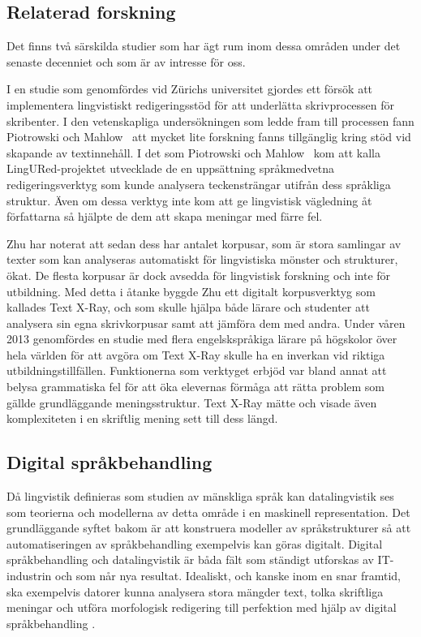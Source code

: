 \documentclass[swedish]{maucsthesis}
\begin{document}
\subsection{Relaterad forskning}\label{relateradforskning}

Det finns två särskilda studier som har ägt rum inom dessa områden under det
senaste decenniet och som är av intresse för oss.

I en studie som genomfördes vid Zürichs universitet gjordes ett försök att
implementera lingvistiskt redigeringsstöd för att underlätta skrivprocessen för
skribenter. I den vetenskapliga undersökningen som ledde fram till processen
fann Piotrowski och Mahlow~\cite{Piotrowski:2009} att mycket lite forskning fanns tillgänglig kring stöd vid skapande av textinnehåll. I det som Piotrowski och Mahlow~\cite{Piotrowski:2009} kom att
kalla LingURed-projektet utvecklade de en uppsättning språkmedvetna
redigeringsverktyg som kunde analysera teckensträngar utifrån dess språkliga
struktur. Även om dessa verktyg inte kom att ge lingvistisk vägledning åt
författarna så hjälpte de dem att skapa meningar med färre fel.

Zhu\cite{zhu:2015} har noterat att sedan dess har antalet korpusar, som är stora
samlingar av texter som kan analyseras automatiskt för lingvistiska mönster och
strukturer, ökat. De flesta korpusar är dock avsedda för lingvistisk forskning och
inte för utbildning. Med detta i åtanke byggde Zhu \cite{zhu:2015} ett
digitalt korpusverktyg som kallades Text X-Ray, och som skulle hjälpa både lärare och
studenter att analysera sin egna skrivkorpusar samt att jämföra dem med andra.
Under våren 2013 genomfördes en studie med flera engelskspråkiga lärare på
högskolor över hela världen för att avgöra om Text X-Ray skulle ha en inverkan
vid riktiga utbildningstillfällen. Funktionerna som verktyget erbjöd var bland
annat att belysa grammatiska fel för att öka elevernas förmåga att rätta problem
som gällde grundläggande meningsstruktur. Text X-Ray mätte och visade även
komplexiteten i en skriftlig mening sett till dess längd.

\subsection{Digital språkbehandling}\label{språkteknologi}

Då lingvistik definieras som studien av mänskliga språk kan datalingvistik ses som teorierna och modellerna av detta område i en maskinell representation. Det
grundläggande syftet bakom är att konstruera modeller av
språkstrukturer så att automatiseringen av språkbehandling exempelvis kan göras
digitalt. Digital språkbehandling och datalingvistik är båda fält som ständigt utforskas
av IT-industrin och som når nya resultat. Idealiskt, och kanske inom en snar
framtid, ska exempelvis datorer kunna analysera stora mängder text, tolka
skriftliga meningar och utföra morfologisk redigering till perfektion med hjälp
av digital språkbehandling \cite{nugues:2014}.
\end{document}
